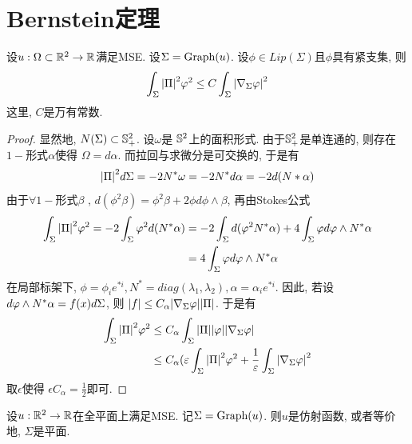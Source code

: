 \section{Bernstein定理}
\begin{proposition} \label{caccio}
    设$u: \Omega \subset \R^2 \to \R$满足MSE. 设$\Sigma=\G(u)$. 设$\phi \in Lip(\Sigma)$且$\phi$具有紧支集, 则
    \begin{equation}
        \int_{\Sigma}\abs{\II}^2\phi^2 \le C\int_\Sigma \abs{\nabla_{\Sigma}\phi}^2
    \end{equation}
    这里,  $C$是万有常数.
\end{proposition}
\begin{proof}
    显然地, $\N(\Sigma) \subset \S^2_+$. 设$\omega$是 $\S^2$上的面积形式. 由于$\S^2_+$是单连通的, 则存在$1-$形式$\alpha$使得  $\Omega=d\alpha$. 而拉回与求微分是可交换的, 于是有 
    \begin{equation}
        \abs{\II}^2d\Sigma=-2\N^*\omega=-2\N^*d\alpha=-2d(\N*\alpha)
    \end{equation}
    由于$\forall 1-$形式$\beta$ , $d(\phi^2\beta)=\phi^2\beta+2\phi d\phi\wedge\beta$, 再由Stokes公式
    \begin{equation}
        \begin{split}
            \int_\Sigma \abs{\II}^2\phi^2 = -2 \int_\Sigma \phi^2 d(\N^*\alpha) &=-2\int_\Sigma d(\phi^2\N^*\alpha)+4\int_\Sigma \phi d\phi\wedge N^*\alpha\\
            &= 4\int_\Sigma  \phi d\phi\wedge N^*\alpha
        \end{split}
    \end{equation}
    在局部标架下, $\phi=\phi_i e^{*i}, N^*=diag(\lambda_1,\lambda_2), \alpha=\alpha_i e^{*i}$. 因此, 若设 $d\phi\wedge \N^*\alpha= f(x)d\Sigma$, 则 $\abs{f} \le C_\alpha \abs{\nabla_\Sigma \phi}\abs{\II}$. 于是有
    \begin{equation}
        \begin{split}
            \int_\Sigma \abs{\II}^2\phi^2 &\le C_\alpha \int_\Sigma \abs{\II}\abs{\phi} \abs{\nabla_\Sigma \phi} \\
            & \le C_\alpha(\epsilon \int_\Sigma \abs{\II}^2\phi^2 + \frac{1}{\epsilon}\int_\Sigma  \abs{\nabla_\Sigma \phi}^2 \\
        \end{split}
    \end{equation}
    取$\epsilon$使得 $\epsilon C_\alpha=\frac{1}{2}$即可.
\end{proof}
\begin{theorem}[Bernstein定理] \label{graph_bernstein}
    设$u: \R^2 \to \R$在全平面上满足MSE.  记$\Sigma=\G(u)$. 则$u$是仿射函数, 或者等价地, $\Sigma$是平面.
\end{theorem}
